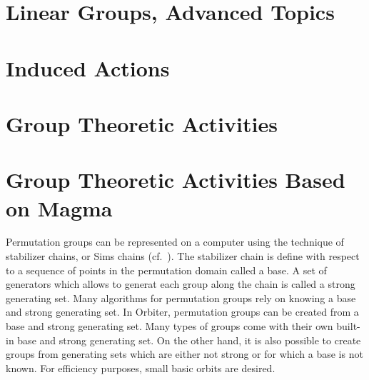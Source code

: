 

\bigskip


\clearpage


\section{Linear Groups, Advanced Topics}
\label{sec:lineargroups:advanced:topics}



\bigskip


\clearpage



\section{Induced Actions}
\label{sec:induced:actions}



\bigskip


\clearpage

\section{Group Theoretic Activities}
\label{sec:group:theoretic:activities}



\bigskip


\clearpage

\section{Group Theoretic Activities Based on Magma}
\label{sec:group:magma}



\bigskip


\clearpage

Permutation groups can be represented on a computer using the technique of stabilizer chains, or Sims chains 
(cf.~\cite{Holt05,Seress03}). 
The stabilizer chain is define with respect to a sequence of points in the permutation domain called a base. 
A set of generators which allows to generat each group along the chain is called a strong generating set. 
Many algorithms for permutation groups rely on knowing a base and strong generating set. 
In Orbiter, permutation groups can be created from a base and strong generating set. 
Many types of groups come with their own built-in base and strong generating set. 
On the other hand, it is also possible to create groups from generating sets which are either not strong or 
for which a base is not known. For efficiency purposes, small basic orbits are desired.


